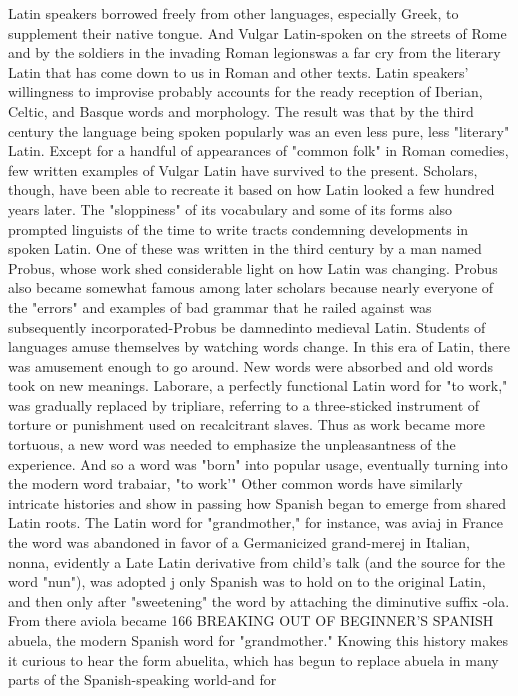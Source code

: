 \documentclass[14pt,a4paper,oneside]{memoir}
\begin{document}
{{{{Latin speakers borrowed freely from other languages, especially Greek,
to supplement their native tongue. And Vulgar Latin-spoken on the
streets of Rome and by the soldiers in the invading Roman legionswas a far cry from the literary Latin that has come down to us in Roman and other texts. Latin speakers' willingness to improvise probably
accounts for the ready reception of Iberian, Celtic, and Basque words
and morphology. The result was that by the third century the language
being spoken popularly was an even less pure, less "literary" Latin.
Except for a handful of appearances of "common folk" in Roman comedies, few written examples of Vulgar Latin have survived
to the present. Scholars, though, have been able to recreate it based
on how Latin looked a few hundred years later. The "sloppiness" of
its vocabulary and some of its forms also prompted linguists of the
time to write tracts condemning developments in spoken Latin. One
of these was written in the third century by a man named Probus,
whose work shed considerable light on how Latin was changing. Probus also became somewhat famous among later scholars because
nearly everyone of the "errors" and examples of bad grammar that he
railed against was subsequently incorporated-Probus be damnedinto medieval Latin.
Students of languages amuse themselves by watching words
change. In this era of Latin, there was amusement enough to go
around. New words were absorbed and old words took on new meanings. Laborare, a perfectly functional Latin word for "to work," was
gradually replaced by tripliare, referring to a three-sticked instrument
of torture or punishment used on recalcitrant slaves. Thus as work
became more tortuous, a new word was needed to emphasize the unpleasantness of the experience. And so a word was "born" into popular
usage, eventually turning into the modern word trabaiar, "to work'"
Other common words have similarly intricate histories and
show in passing how Spanish began to emerge from shared Latin roots.
The Latin word for "grandmother," for instance, was aviaj in France
the word was abandoned in favor of a Germanicized grand-merej in
Italian, nonna, evidently a Late Latin derivative from child's talk (and
the source for the word "nun"), was adopted j only Spanish was to hold
on to the original Latin, and then only after "sweetening" the word
by attaching the diminutive suffix -ola. From there aviola became
166 BREAKING OUT OF BEGINNER'S SPANISH
abuela, the modern Spanish word for "grandmother." Knowing this
history makes it curious to hear the form abuelita, which has begun to
replace abuela in many parts of the Spanish-speaking world-and for
}}}}
\end{document}

